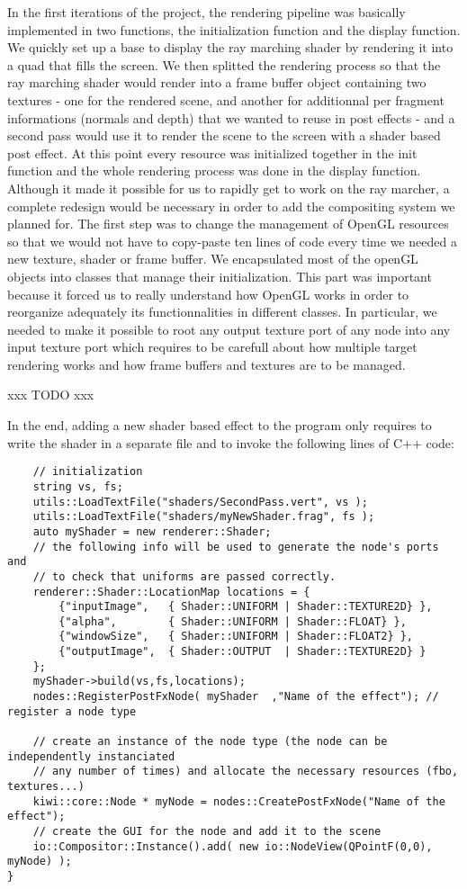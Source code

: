 In the first iterations of the project, the rendering pipeline was basically implemented
in two functions, the initialization function and the display function. We quickly
set up a base to display the ray marching shader by rendering it into a quad that
fills the screen. We then splitted the rendering process so that the ray marching
shader would render into a frame buffer object containing two textures - one for
the rendered scene, and another for additionnal per fragment informations (normals and depth)
that we wanted to reuse in post effects - and a second pass would use it to render
the scene to the screen with a shader based post effect. At this point every
resource was initialized together in the init function and the whole rendering
process was done in the display function. Although it made it possible for us to
rapidly get to work on the ray marcher, a complete redesign would be necessary in
order to add the compositing system we planned for. The first step was to change
the management of OpenGL resources so that we would not have to copy-paste ten lines
of code every time we needed a new texture, shader or frame buffer. We encapsulated
most of the openGL objects into classes that manage their initialization. This part
was important because it forced us to really understand how OpenGL works in order
to reorganize adequately its functionnalities in different classes. In particular,
we needed to make it possible to root any output texture port of any node into any input
texture port which requires to be carefull about how multiple target rendering works
and how frame buffers and textures are to be managed.

xxx TODO xxx

In the end, adding a new shader based effect to the program only requires to write
the shader in a separate file and to invoke the following lines of C++ code:
\begin{lstlisting}
    // initialization
    string vs, fs;
    utils::LoadTextFile("shaders/SecondPass.vert", vs );
    utils::LoadTextFile("shaders/myNewShader.frag", fs );
    auto myShader = new renderer::Shader;
    // the following info will be used to generate the node's ports and
    // to check that uniforms are passed correctly.
    renderer::Shader::LocationMap locations = {
        {"inputImage",   { Shader::UNIFORM | Shader::TEXTURE2D} },
        {"alpha",        { Shader::UNIFORM | Shader::FLOAT} },
        {"windowSize",   { Shader::UNIFORM | Shader::FLOAT2} },
        {"outputImage",  { Shader::OUTPUT  | Shader::TEXTURE2D} }
    };
    myShader->build(vs,fs,locations);
    nodes::RegisterPostFxNode( myShader  ,"Name of the effect"); // register a node type

    // create an instance of the node type (the node can be independently instanciated
    // any number of times) and allocate the necessary resources (fbo, textures...)
    kiwi::core::Node * myNode = nodes::CreatePostFxNode("Name of the effect");
    // create the GUI for the node and add it to the scene
    io::Compositor::Instance().add( new io::NodeView(QPointF(0,0), myNode) );
}
\end{lstlisting}

